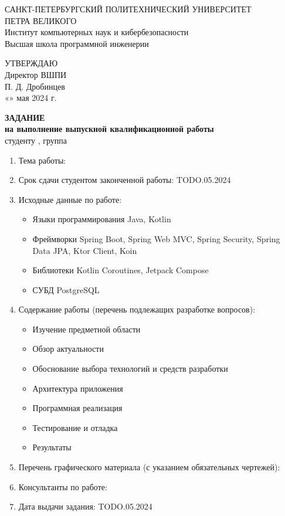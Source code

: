 \begin{center}
  {САНКТ-ПЕТЕРБУРГСКИЙ ПОЛИТЕХНИЧЕСКИЙ УНИВЕРСИТЕТ\\ ПЕТРА ВЕЛИКОГО} \\
  {Институт компьютерных наук и кибербезопасности} \\
  {Высшая школа программной инженерии} \\

  {
  \begin{flushright}
    УТВЕРЖДАЮ\\
    Директор ВШПИ\\
    \underline{\hspace{2.2cm}} П. Д. Дробинцев\\
    «\underline{\hspace{0.8cm}}» мая 2024 г.\\[1.8cm]
  \end{flushright}
  }

  \textbf{ЗАДАНИЕ} \\
  \textbf{на выполнение выпускной квалификационной работы}\\
  студенту \AuthorFull, группа \Group \\[0.5cm]
  \begin{enumerate}[label=\arabic*.]
    \item Тема работы: \Theme
    \item Срок сдачи студентом законченной работы: TODO.05.2024
    \item Исходные данные по работе:
    \begin{itemize}
      \item Языки программирования Java, Kotlin
      \item Фреймворки Spring Boot, Spring Web MVC, Spring Security, Spring Data JPA, Ktor Client, Koin
      \item Библиотеки Kotlin Coroutines, Jetpack Compose
      \item СУБД PostgreSQL
    \end{itemize}
    \item Содержание работы (перечень подлежащих разработке вопросов):
    \begin{itemize}
      \item Изучение предметной области
      \item Обзор актуальности
      \item Обоснование выбора технологий и средств разработки
      \item Архитектура приложения
      \item Программная реализация
      \item Тестирование и отладка
      \item Результаты
    \end{itemize}
    \item Перечень графического материала (с указанием обязательных чертежей):
    \item Консультанты по работе:
    \item Дата выдачи задания: TODO.05.2024
  \end{enumerate}
\end{center}
